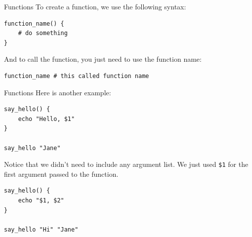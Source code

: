 \documentclass[10pt]{beamer}
\begin{document}
\begin{frame}[label={sec:org0dd1cf5},fragile]{Functions}
 To create a function, we use the following syntax:

\begin{verbatim}
function_name() {
    # do something
}
\end{verbatim}

And to call the function, you just need to use the function name:

\begin{verbatim}
function_name # this called function name
\end{verbatim}
\end{frame}

\begin{frame}[label={sec:orgfd0bad0},fragile]{Functions}
 Here is another example:

\begin{verbatim}
say_hello() {
    echo "Hello, $1"
}

say_hello "Jane"
\end{verbatim}

Notice that we didn't need to include any argument list. We just used \texttt{\$1} for the
first argument passed to the function.

\begin{verbatim}
say_hello() {
    echo "$1, $2"
}

say_hello "Hi" "Jane"
\end{verbatim}
\end{frame}
\end{document}
